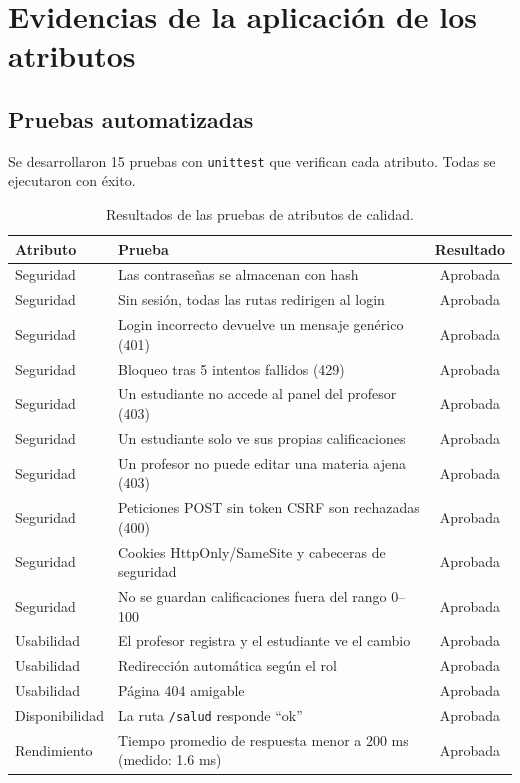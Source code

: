 \documentclass[11pt,letterpaper]{article}
\begin{document}
\section{Evidencias de la aplicación de los atributos}

\subsection{Pruebas automatizadas}
Se desarrollaron 15 pruebas con \texttt{unittest} que verifican cada atributo. Todas
se ejecutaron con éxito.

\begin{table}[H]
\centering
\small
\begin{tabularx}{\textwidth}{l Y c}
\toprule
{}
Atributo & Prueba & Resultado \\
\midrule
Seguridad & Las contraseñas se almacenan con hash & Aprobada \\
Seguridad & Sin sesión, todas las rutas redirigen al login & Aprobada \\
Seguridad & Login incorrecto devuelve un mensaje genérico (401) & Aprobada \\
Seguridad & Bloqueo tras 5 intentos fallidos (429) & Aprobada \\
Seguridad & Un estudiante no accede al panel del profesor (403) & Aprobada \\
Seguridad & Un estudiante solo ve sus propias calificaciones & Aprobada \\
Seguridad & Un profesor no puede editar una materia ajena (403) & Aprobada \\
Seguridad & Peticiones POST sin token CSRF son rechazadas (400) & Aprobada \\
Seguridad & Cookies HttpOnly/SameSite y cabeceras de seguridad & Aprobada \\
Seguridad & No se guardan calificaciones fuera del rango 0--100 & Aprobada \\
Usabilidad & El profesor registra y el estudiante ve el cambio & Aprobada \\
Usabilidad & Redirección automática según el rol & Aprobada \\
Usabilidad & Página 404 amigable & Aprobada \\
Disponibilidad & La ruta \texttt{/salud} responde ``ok'' & Aprobada \\
Rendimiento & Tiempo promedio de respuesta menor a 200 ms (medido: 1.6 ms) & Aprobada \\
\bottomrule
\end{tabularx}
\caption{Resultados de las pruebas de atributos de calidad.}
\end{table}
\end{document}
